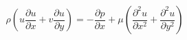 \documentclass[preview,border=2pt]{standalone}
\begin{document}
\[
\rho\left(u\frac{\partial u}{\partial x}+v\frac{\partial u}{\partial y}\right)=-\frac{\partial p}{\partial x}+\mu\left(\frac{\partial^{2}u}{\partial x^{2}}+\frac{\partial^{2}u}{\partial y^{2}}\right)
\]
\end{document}
